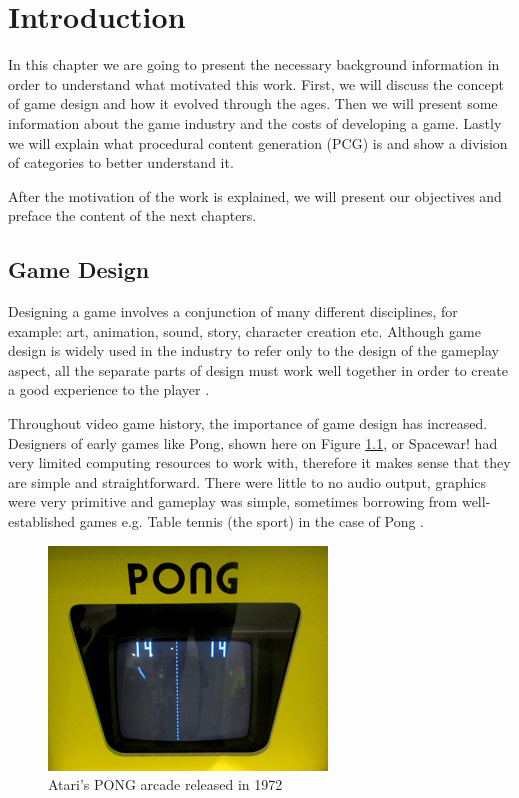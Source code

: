 \chapter{Introduction} %
\label{chapter:intro}

In this chapter we are going to present the necessary background information in order to understand what motivated this work. First, we will discuss the concept of game design and how it evolved through the ages. Then we will present some information about the game industry and the costs of developing a game. Lastly we will explain what procedural content generation (PCG) is and show a division of categories to better understand it.

After the motivation of the work is explained, we will present our objectives and preface the content of the next chapters. 

\section{Game Design}

Designing a game involves a conjunction of many different disciplines, for example: art, animation, sound, story, character creation etc. Although game design is widely used in the industry to refer only to the design of the gameplay aspect, all the separate parts of design must work well together in order to create a good experience to the player \cite{zubek:2020}.

Throughout video game history, the importance of game design has increased. Designers of early games like Pong, shown here on Figure \ref{fig:pong}, or Spacewar! had very limited computing resources to work with, therefore it makes sense that they are simple and straightforward. There were little to no audio output, graphics were very primitive and gameplay was simple, sometimes borrowing from well-established games e.g. Table tennis (the sport) in the case of Pong \cite{wolf:2007}.

\begin{figure}[h]
    \caption{Atari's PONG arcade released in 1972}
    \centerline{\includegraphics{images/introduction/PongScreenAtariOriginal.jpeg}}
    \label{fig:pong}
\end{figure}

